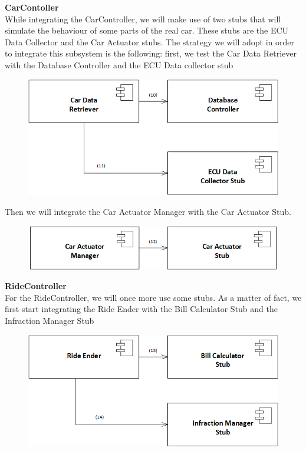 \documentclass{article}
\begin{document}
\textbf{CarContoller}
\\
While integrating the CarController, we will make use of two stubs that will simulate the behaviour of some parts of the real car. These stubs are the ECU Data Collector and the Car Actuator stubs. The strategy we will adopt in order to integrate this subsystem is the following: first, we test the Car Data Retriever with the Database Controller and the ECU Data collector stub
\begin{figure}[H]
\includegraphics[scale=0.5]{CarController/CarController1}
\centering
\end{figure}
Then we will integrate the Car Actuator Manager with the Car Actuator Stub.
\begin{figure}[H]
\includegraphics[scale=0.5]{CarController/CarController2}
\centering
\end{figure}
\textbf{RideController}
\\
For the RideController, we will once more use some stubs. As a matter of fact, we first start integrating the Ride Ender with the Bill Calculator Stub and the Infraction Manager Stub
\begin{figure}[H]
\includegraphics[scale=0.5]{RideController/RideController1}
\centering
\end{figure}
\end{document}
